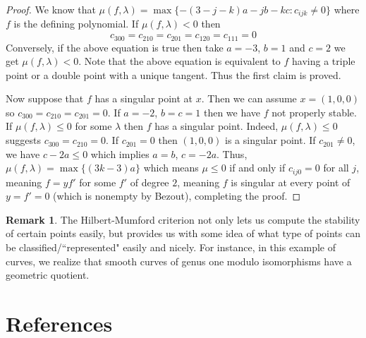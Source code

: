 \documentclass[12pt]{article}
\theoremstyle{remark}
\theoremstyle{definition}
\newtheorem{remark}{Remark}[section]
\begin{document}
    \begin{proof}
        We know that $\mu(f,\lambda)=\max\{-(3-j-k)a-jb-kc:c_{ijk}\neq 0\}$ where $f$ is the defining polynomial. If $\mu(f,\lambda)<0$ then
        \[c_{300}=c_{210}=c_{201}=c_{120}=c_{111}=0\]
        Conversely, if the above equation is true then take $a=-3$, $b=1$ and $c=2$ we get $\mu(f,\lambda)<0$. Note that the above equation is equivalent to $f$ having a triple point or a double point with a unique tangent. Thus the first claim is proved.

        Now suppose that $f$ has a singular point at $x$. Then we can assume $x=(1,0,0)$ so $c_{300}=c_{210}=c_{201}=0$. If $a=-2$, $b=c=1$ then we have $f$ not properly stable. If $\mu(f,\lambda)\leqslant 0$ for some $\lambda$ then $f$ has a singular point. Indeed, $\mu(f,\lambda)\leqslant 0$ suggests $c_{300}=c_{210}=0$. If $c_{201}=0$ then $(1,0,0)$ is a singular point. If $c_{201}\neq 0$, we have $c-2a\leqslant 0$ which implies $a=b$, $c=-2a$. Thus, $\mu(f,\lambda)=\max\{(3k-3)a\}$ which means $\mu\leqslant0$ if and only if $c_{ij0}=0$ for all $j$, meaning $f=yf'$ for some $f'$ of degree $2$, meaning $f$ is singular at every point of $y=f'=0$ (which is nonempty by Bezout), completing the proof.
    \end{proof}
    \begin{remark}
        The Hilbert-Mumford criterion not only lets us compute the stability of certain points easily, but provides us with some idea of what type of points can be classified/``represented" easily and nicely. For instance, in this example of curves, we realize that smooth curves of genus one modulo isomorphisms have a geometric quotient.
    \end{remark}
    \newpage
    \section{References}
    \nocite{*}
    \renewcommand{\section}[2]{\vskip 0.01em}
    \printbibliography
\end{document}

